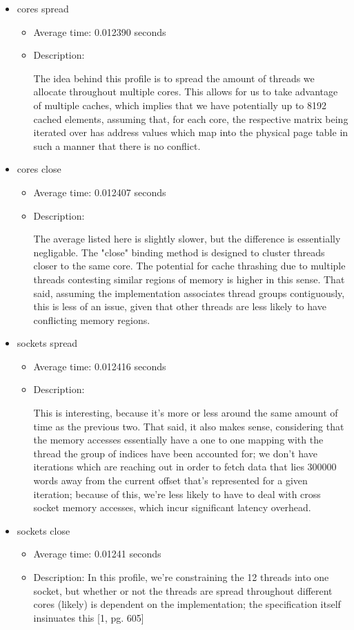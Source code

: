 \documentclass{article}
\begin{document}
\begin{itemize}
\item cores spread
  \begin{itemize}
    \item Average time: 0.012390 seconds
    \item Description:

      The idea behind this profile is to spread the amount of threads we allocate throughout multiple cores.
      This allows for us to take advantage of multiple caches, which implies that we have potentially up to 8192 cached elements,
      assuming that, for each core, the respective matrix being iterated over has address values which map into the physical
      page table in such a manner that there is no conflict.
    \end{itemize}
  \item cores close
    \begin{itemize}
    \item Average time: 0.012407 seconds
    \item Description:

      The average listed here is slightly slower, but the difference is essentially negligable. The "close" binding method is designed to cluster threads closer to the same core. The potential for cache thrashing due to multiple threads contesting similar regions of memory is higher in this sense. That said, assuming the implementation associates thread groups contiguously, this is less of an issue, given that other threads are less likely to have conflicting memory regions.
    \end{itemize}
  \item sockets spread
    \begin{itemize}
    \item Average time: 0.012416 seconds
    \item Description:

      This is interesting, because it's more or less around the same amount of time as the previous two. That said, it also makes sense, considering that the memory accesses essentially have a one to one mapping with the thread the group of indices have been accounted for; we don't have iterations which are reaching out in order to fetch data that lies 300000 words away from the current offset that's represented for a given iteration; because of this, we're less likely to have to deal with cross socket memory accesses, which incur significant latency overhead.
    \end{itemize}

  \item sockets close
    \begin{itemize}
    \item Average time: 0.01241 seconds
    \item Description:
      In this profile, we're constraining the 12 threads into one socket, but whether or not the threads are spread throughout different cores (likely) is dependent on the implementation; the specification itself insinuates this [1, pg. 605]
    \end{itemize}
\end{itemize}
\end{document}
